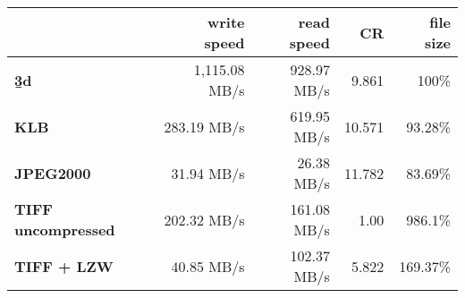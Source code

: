 \begin{table}[hbp]
  \renewcommand{\arraystretch}{2}
  \setlength{\tabcolsep}{9pt}
  \centering
  \begin{tabular}{lrrrr}
      & \textbf{write speed} & \textbf{read speed} & \textbf{CR} & \textbf{file size} \\
      \hline
      \hline
      \textbf{\b3d} & 1,115.08 MB/s & 928.97 MB/s & 9.861 & 100\% \\ \hline
      \textbf{KLB} & 283.19 MB/s & 619.95 MB/s & 10.571 & 93.28\% \\ \hline
      \textbf{JPEG2000} & 31.94 MB/s & 26.38 MB/s & 11.782 & 83.69\% \\ \hline
      \textbf{TIFF uncompressed} & 202.32 MB/s & 161.08 MB/s & 1.00 & 986.1\% \\ \hline
      \textbf{TIFF + LZW} & 40.85 MB/s & 102.37 MB/s & 5.822 & 169.37\%
  \end{tabular}
  \label{tab:performance}
\end{table}



